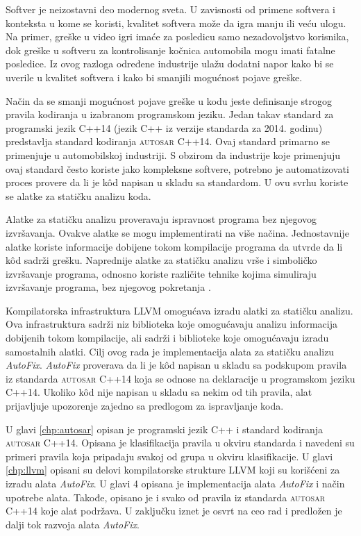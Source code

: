 \documentclass[12pt,oneside]{memoir}
\begin{document}
Softver je neizostavni deo modernog sveta. U zavisnosti od primene softvera i konteksta u kome se koristi, kvalitet softvera mo\v{z}e da igra
manju ili ve\'{c}u ulogu. Na primer, gre\v{s}ke u video igri ima\'{c}e za posledicu samo nezadovoljstvo korisnika, dok gre\v{s}ke u softveru
za kontrolisanje ko\v{c}nica automobila mogu imati fatalne posledice. Iz ovog razloga određene industrije ula\v{z}u dodatni napor kako bi se uverile u kvalitet softvera
i kako bi smanjili mogu\'{c}nost pojave gre\v{s}ke. \par
Na\v{c}in da se smanji mogu\'{c}nost pojave gre\v{s}ke u kodu jeste definisanje strogog pravila kodiranja u izabranom programskom jeziku. Jedan takav standard za programski jezik C++14 (jezik C++ iz verzije standarda za 2014. godinu) predstavlja standard kodiranja \textsc{autosar} C++14. Ovaj standard primarno se primenjuje u automobilskoj industriji. S obzirom da industrije koje primenjuju ovaj standard \v{c}esto koriste jako kompleksne softvere, potrebno je automatizovati proces provere da li je k\^{o}d napisan u skladu sa standardom. U ovu svrhu koriste se alatke za stati\v{c}ku analizu koda. \par Alatke za stati\v{c}ku analizu proveravaju ispravnost programa bez njegovog izvr\v{s}avanja. Ovakve alatke se mogu implementirati na vi\v{s}e na\v{c}ina. Jednostavnije alatke koriste informacije dobijene tokom kompilacije programa da utvrde da li k\^{o}d sadr\v{z}i gre\v{s}ku. Naprednije alatke za stati\v{c}ku analizu vr\v{s}e i simboli\v{c}ko izvr\v{s}avanje programa, odnosno koriste razli\v{c}ite tehnike kojima simuliraju izvr\v{s}avanje programa, bez njegovog pokretanja \cite{Etran, AutoCheck}. \par
Kompilatorska infrastruktura LLVM omogu\'{c}ava izradu alatki za stati\v{c}ku analizu. Ova infrastruktura sadr\v{z}i niz biblioteka koje omogu\'{c}avaju analizu informacija dobijenih tokom kompilacije, ali sadr\v{z}i i biblioteke koje omogu\'{c}avaju izradu samostalnih alatki. Cilj ovog rada je implementacija alata za stati\v{c}ku analizu
\textit{AutoFix}. \textit{AutoFix} proverava da li je k\^{o}d napisan u skladu sa podskupom pravila iz standarda \textsc{autosar} C++14 koja se odnose na deklaracije u programskom jeziku C++14. Ukoliko k\^{o}d nije napisan u skladu sa nekim od tih pravila, alat prijavljuje upozorenje zajedno sa predlogom za ispravljanje koda. 

U glavi \ref{chp:autosar} opisan je programski jezik C++ i standard kodiranja \textsc{autosar} C++14. Opisana je klasifikacija pravila u okviru standarda i navedeni su primeri pravila koja pripadaju svakoj od grupa u okviru klasifikacije. U glavi \ref{chp:llvm} opisani su delovi kompilatorske strukture LLVM koji su kori\v{s}\'{c}eni za izradu alata \textit{AutoFix}. U glavi 4 opisana je implementacija alata \textit{AutoFix} i na\v{c}in upotrebe alata. Takođe, opisano je i svako od pravila iz standarda \textsc{autosar} C++14 koje alat podr\v{z}ava. U zaklju\v{c}ku iznet je osvrt na ceo rad i predlo\v{z}en je dalji tok razvoja alata \textit{AutoFix}.
\end{document}
